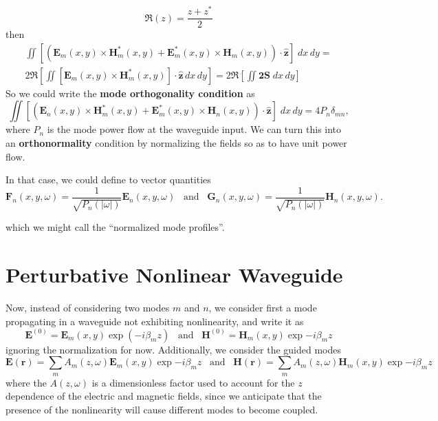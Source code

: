 \begin{equation}
    \Re(z)=\frac{z+z^*}{2}
\end{equation}
then
\begin{multline}
    \iint\left[\left(\textbf{E}_m(x,y)\times\textbf{H}^*_m(x,y)+\textbf{E}^*_m(x,y)\times\textbf{H}_m(x,y)\right)\cdot\hat{\textbf{z}}\right]\;dx\,dy=\\2\Re\left[\iint\left[\textbf{E}_m(x,y)\times\textbf{H}^*_m(x,y)\right]\cdot\hat{\textbf{z}}\,dx\,dy\right]=2\Re\left[\iint\textbf{2S}\;dx\,dy\right]
\end{multline}
So we could write the \textbf{mode orthogonality condition} as
\begin{equation}
    \boxed{\iint\left[\left(\textbf{E}_n(x,y)\times\textbf{H}^*_m(x,y)+\textbf{E}^*_m(x,y)\times\textbf{H}_n(x,y)\right)\cdot\hat{\textbf{z}}\right]\;dx\,dy=4P_n\delta_{mn}},
\end{equation}
where $P_n$ is the mode power flow at the waveguide input. We can turn this into an \textbf{orthonormality} condition by normalizing the fields so as to have unit power flow.

In that case, we could define to vector quantities
\begin{equation}
    \textbf{F}_n(x, y, \omega) = \frac{1}{\sqrt{P_n(|\omega|)}}\textbf{E}_n(x, y, \omega) \;\;\;\text{and}\;\;\;\textbf{G}_n(x, y, \omega) = \frac{1}{\sqrt{P_n(|\omega|)}}\textbf{H}_n(x, y, \omega).
\end{equation}

which we might call the ``normalized mode profiles''.

\section{Perturbative Nonlinear Waveguide}

Now, instead of considering two modes $m$ and $n$, we consider first a mode propagating in a waveguide not exhibiting nonlinearity, and write it as
\begin{equation}
    \textbf{E}^{(0)}=\textbf{E}_m(x,y)\exp(-i\beta_mz)\;\;\;\text{and}\;\;\;\textbf{H}^{(0)}=\textbf{H}_m(x,y)\exp{-i\beta_mz}
    \label{eq:fields.definitions}
\end{equation}
ignoring the normalization for now. Additionally, we consider the guided modes
\begin{equation}
    \textbf{E}(\textbf{r})=\sum_mA_m(z,\omega)\textbf{E}_m(x,y)\exp{-i\beta_m z}\;\;\;\text{and}\;\;\;\textbf{H}(\textbf{r})=\sum_mA_m(z,\omega)\textbf{H}_m(x,y)\exp{-i\beta_m z}
\end{equation}
where the $A(z,\omega)$ is a dimensionless factor used to account for the $z$ dependence of the electric and magnetic fields, since we anticipate that the presence of the nonlinearity will cause different modes to become coupled.

